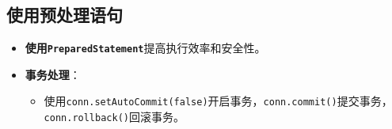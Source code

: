 \documentclass[a4paper, 10pt]{ctexart}
\begin{document}
\subsection{使用预处理语句}
\begin{itemize}
  \item \textbf{使用\texttt{PreparedStatement}}提高执行效率和安全性。
  \item \textbf{事务处理}：
  \begin{itemize}
    \item 使用\texttt{conn.setAutoCommit(false)}开启事务，\texttt{conn.commit()}提交事务，\texttt{conn.rollback()}回滚事务。
  \end{itemize}
\end{itemize}
\end{document}
